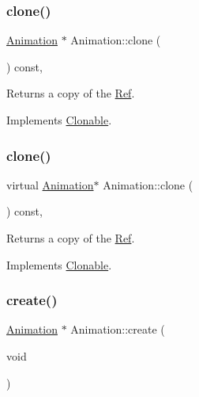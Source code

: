 \subsubsection{\texorpdfstring{clone()}{clone()}\hspace{0.1cm}{\footnotesize\ttfamily [1/2]}}
{\footnotesize\ttfamily \hyperlink{classAnimation}{Animation} $\ast$ Animation\+::clone (\begin{DoxyParamCaption}{ }\end{DoxyParamCaption}) const\hspace{0.3cm}{\ttfamily [override]}, {\ttfamily [virtual]}}

Returns a copy of the \hyperlink{classRef}{Ref}. 

Implements \hyperlink{classClonable_a36b05a0fa605f4f269e5884bde7f9e0c}{Clonable}.

\mbox{\label{classAnimation_af9e3cac2dab66da3a0d91d5b23e145e5}} 
\subsubsection{\texorpdfstring{clone()}{clone()}\hspace{0.1cm}{\footnotesize\ttfamily [2/2]}}
{\footnotesize\ttfamily virtual \hyperlink{classAnimation}{Animation}$\ast$ Animation\+::clone (\begin{DoxyParamCaption}{ }\end{DoxyParamCaption}) const\hspace{0.3cm}{\ttfamily [override]}, {\ttfamily [virtual]}}

Returns a copy of the \hyperlink{classRef}{Ref}. 

Implements \hyperlink{classClonable_a36b05a0fa605f4f269e5884bde7f9e0c}{Clonable}.

\mbox{\label{classAnimation_a407cccd7d74a3ad381224410f00455f1}} 
\subsubsection{\texorpdfstring{create()}{create()}\hspace{0.1cm}{\footnotesize\ttfamily [1/2]}}
{\footnotesize\ttfamily \hyperlink{classAnimation}{Animation} $\ast$ Animation\+::create (\begin{DoxyParamCaption}\item[{void}]{ }\end{DoxyParamCaption})\hspace{0.3cm}{\ttfamily [static]}}

